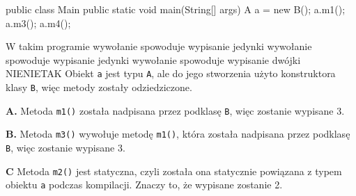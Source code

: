 \begin{solutions}
\begin{java}
        public class Main {
          public static void main(String[] args) {
            A a = new B();
            a.m1();
            a.m3();
            a.m4();
          }
        }    
    \end{java}
    W takim programie
    \answerss
    {wywołanie  spowoduje wypisanie jedynki}
    {wywołanie  spowoduje wypisanie jedynki}
    {wywołanie  spowoduje wypisanie dwójki}
    {NIE}{NIE}{TAK}
    Obiekt \texttt{a} jest typu \texttt{A}, ale do jego stworzenia użyto konstruktora klasy \texttt{B}, więc metody zostały odziedziczone.
    
    \textbf{A.} Metoda \texttt{m1()} została nadpisana przez podklasę \texttt{B}, więc zostanie wypisane 3.

    \textbf{B.} Metoda \texttt{m3()} wywołuje metodę \texttt{m1()}, która została nadpisana przez podklasę \texttt{B}, więc zostanie wypisane 3.

    \textbf{C} Metoda \texttt{m2()} jest statyczna, czyli została ona statycznie powiązana z typem obiektu \texttt{a} podczas kompilacji. Znaczy to, że wypisane zostanie 2.

    



\end{solutions}
